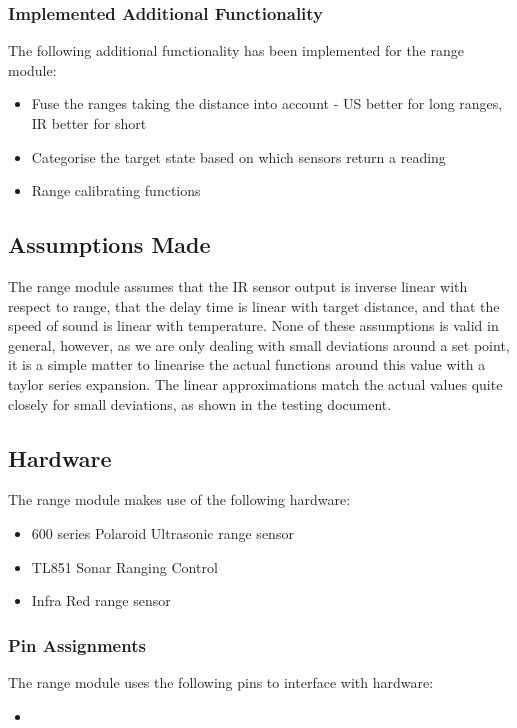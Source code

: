 \documentclass[]{report}
\begin{document}
\subsubsection{Implemented Additional Functionality}
The following additional functionality has been implemented for the range module:
\begin{itemize}
	\item Fuse the ranges taking the distance into account - US better for long ranges, IR better for short
	\item Categorise the target state based on which sensors return a reading
	\item Range calibrating functions
\end{itemize}


\subsection{Assumptions Made}
The range module assumes that the IR sensor output is inverse linear with respect to range, that the delay time is linear with target distance, and that the speed of sound is linear with temperature. None of these assumptions is valid in general, however, as we are only dealing with small deviations around a set point, it is a simple matter to linearise the actual functions around this value with a taylor series expansion. The linear approximations match the actual values quite closely for small deviations, as shown in the testing document.

\subsection{Hardware}
The range module makes use of the following hardware:
\begin{itemize}
	\item 600 series Polaroid Ultrasonic range sensor
	\item TL851 Sonar Ranging Control
	\item Infra Red range sensor
\end{itemize}

\subsubsection{Pin Assignments}
The range module uses the following pins to interface with hardware:
\begin{itemize}
	\item
\end{itemize}
\end{document}
